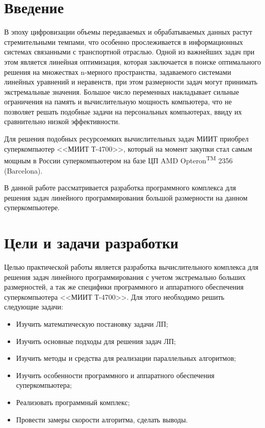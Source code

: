 \documentclass[a4paper,fontsize=14bp]{article}
\author{Ахтямов Д.С.}
\date{\today}
\begin{document}

{\fontsize{12bp}{16bp} \selectfont }  %


\newpage 
{\tableofcontents} 

\newpage
\section*{\centering Введение}

В эпоху цифровизации объемы передаваемых и обрабатываемых данных растут стремительными темпами, 
что особенно прослеживается в информационных системах связанными с транспортной отраслью.
Одной из важнейших задач при этом является линейная оптимизация, которая заключается в поиске
оптимального решения на множествах n-мерного пространства, задаваемого системами линейных уравнений
и неравенств, при этом размерности задач могут принимать экстремальные значения. Большое число 
переменных накладывает сильные ограничения на память и вычислительную мощность компьютера, что 
не позволяет решать подобные задачи на персональных компьютерах, ввиду их сравнительно низкой 
эффективности. \par
Для решения подобных ресурсоемких вычислительных задач МИИТ приобрел суперкомпьютер
<<МИИТ Т-4700>>, который на момент закупки стал самым мощным в России суперкомпьютером на базе ЦП 
AMD Opteron\textsuperscript{\tiny TM} 2356 (Barcelona). \par
В данной работе рассматривается разработка программного комплекса для решения задач 
линейного программирования большой размерности на данном суперкомпьютере.


\newpage

\section{Цели и задачи разработки}
Целью практической работы является разработка вычислительного комплекса для решения задач линейного
программирования с учетом экстремально больших размерностей, а так же 
специфики программного и аппаратного обеспечения суперкомпьютера <<МИИТ Т-4700>>.
Для этого необходимо решить следующие задачи:
\begin{itemize}
  \item Изучить математическую постановку задачи ЛП;
  \item Изучить основные подходы для решения задач ЛП;
  \item Изучить методы и средства для реализации параллельных алгоритмов;
  \item Изучить особенности программного и аппаратного обеспечения суперкомпьютера;
  \item Реализовать программный комплекс;
  \item Провести замеры скорости алгоритма, сделать выводы.
\end{itemize}
\end{document}

